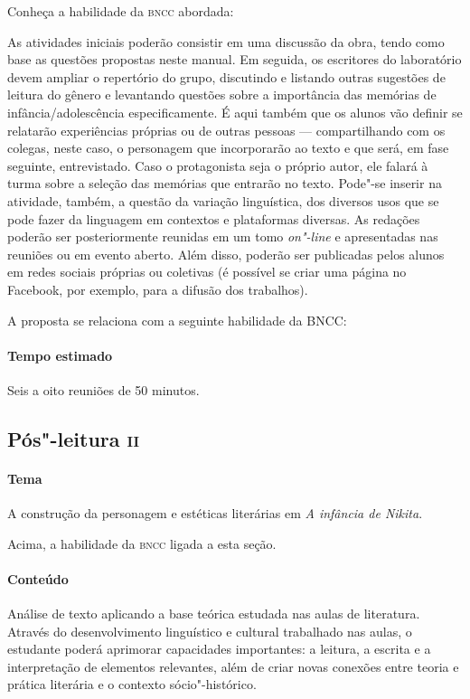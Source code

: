 \documentclass[11pt]{extarticle}
\begin{document}
Conheça a habilidade da \textsc{bncc} abordada:


As atividades iniciais poderão consistir em uma discussão da obra, tendo
como base as questões propostas neste manual. Em seguida, os escritores
do laboratório devem ampliar o repertório do grupo, discutindo e
listando outras sugestões de leitura do gênero e levantando questões
sobre a importância das memórias de infância/adolescência
especificamente. É aqui também que os alunos vão definir se relatarão
experiências próprias ou de outras pessoas --- compartilhando com os
colegas, neste caso, o personagem que incorporarão ao texto e que será,
em fase seguinte, entrevistado. Caso o protagonista seja o próprio
autor, ele falará à turma sobre a seleção das memórias que entrarão no
texto. Pode"-se inserir na atividade, também, a questão da variação
linguística, dos diversos usos que se pode fazer da linguagem em
contextos e plataformas diversas. As redações poderão ser posteriormente reunidas em um
tomo \emph{on"-line} e apresentadas nas reuniões ou em
evento aberto. Além disso, poderão ser publicadas pelos alunos em redes
sociais próprias ou coletivas (é possível se criar uma página no
Facebook, por exemplo, para a difusão dos trabalhos).

A proposta se relaciona com a seguinte habilidade da BNCC:


\paragraph{Tempo estimado} Seis a oito reuniões de 50 minutos.

\subsection{Pós"-leitura \textsc{ii}}

\paragraph{Tema} A construção da personagem e estéticas literárias em \emph{A infância de Nikita}.


Acima, a habilidade da \textsc{bncc} ligada a esta seção.

\paragraph{Conteúdo}
Análise de texto aplicando a base teórica estudada nas aulas de
literatura. Através do desenvolvimento linguístico e cultural trabalhado
nas aulas, o estudante poderá aprimorar capacidades importantes: a
leitura, a escrita e a interpretação de elementos relevantes, além de
criar novas conexões entre teoria e prática literária e o contexto
sócio"-histórico.
\end{document}
